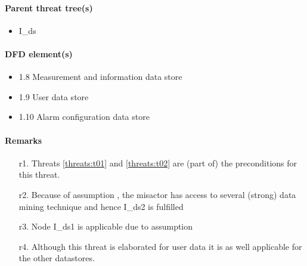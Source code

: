 \paragraph{Parent threat tree(s)}

\begin{itemize}
  \item I\_ds
\end{itemize}

\paragraph{DFD element(s)}

\begin{itemize}
  \item 1.8 Measurement and information data store
  \item 1.9 User data store
  \item 1.10 Alarm configuration data store
\end{itemize}

\paragraph{Remarks}
	\begin{enumerate}
         \item[r1.] Threats \ref{threats:t01} and \ref{threats:t02} are
		(part of) the preconditions for this threat.
         \item[r2.] Because of assumption %
		 , the misactor has access to several (strong) data mining technique and hence
		 I\_ds2 is fulfilled
         \item[r3.] Node I\_ds1 is applicable due to assumption %
         \item[r4.] Although this threat is elaborated for user data it is as
         well applicable for the other datastores.
    \end{enumerate}
